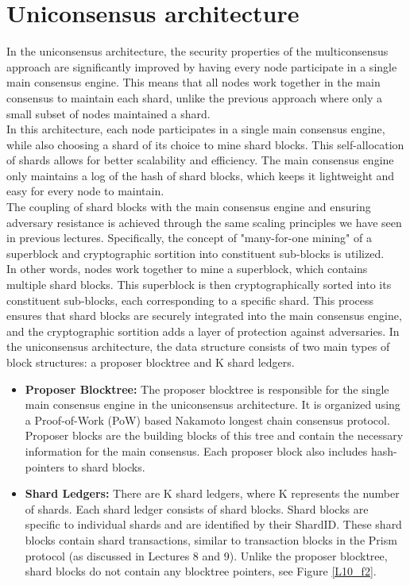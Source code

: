 \section{Uniconsensus architecture}
In the uniconsensus architecture, the security properties of the multiconsensus approach are significantly improved by having every node participate in a single main consensus engine. This means that all nodes work together in the main consensus to maintain each shard, unlike the previous approach where only a small subset of nodes maintained a shard.\\
In this architecture, each node participates in a single main consensus engine, while also choosing a shard of its choice to mine shard blocks. This self-allocation of shards allows for better scalability and efficiency. The main consensus engine only maintains a log of the hash of shard blocks, which keeps it lightweight and easy for every node to maintain.\\
The coupling of shard blocks with the main consensus engine and ensuring adversary resistance is achieved through the same scaling principles we have seen in previous lectures. Specifically, the concept of "many-for-one mining" of a superblock and cryptographic sortition into constituent sub-blocks is utilized.\\
In other words, nodes work together to mine a superblock, which contains multiple shard blocks. This superblock is then cryptographically sorted into its constituent sub-blocks, each corresponding to a specific shard. This process ensures that shard blocks are securely integrated into the main consensus engine, and the cryptographic sortition adds a layer of protection against adversaries.
In the uniconsensus architecture, the data structure consists of two main types of block structures: a proposer blocktree and K shard ledgers.\\
\begin{itemize}
	\item \textbf{Proposer Blocktree:} The proposer blocktree is responsible for the single main consensus engine in the uniconsensus architecture. It is organized using a Proof-of-Work (PoW) based Nakamoto longest chain consensus protocol. Proposer blocks are the building blocks of this tree and contain the necessary information for the main consensus. Each proposer block also includes hash-pointers to shard blocks.
	\item \textbf{Shard Ledgers:} There are K shard ledgers, where K represents the number of shards. Each shard ledger consists of shard blocks. Shard blocks are specific to individual shards and are identified by their ShardID. These shard blocks contain shard transactions, similar to transaction blocks in the Prism protocol (as discussed in Lectures 8 and 9). Unlike the proposer blocktree, shard blocks do not contain any blocktree pointers, see Figure \ref{L10_f2}.
\end{itemize}
